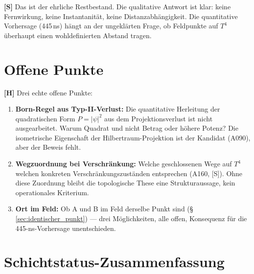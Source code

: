\textbf{[S]} Das ist der ehrliche Restbestand. Die qualitative Antwort
ist klar: keine Fernwirkung, keine Instantanität, keine Distanzabhängigkeit.
Die quantitative Vorhersage (445\,ns) hängt an der ungeklärten Frage,
ob Feldpunkte auf $T^4$ überhaupt einen wohldefinierten Abstand tragen.

\section{Offene Punkte}

\textbf{[H]} Drei echte offene Punkte:

\begin{enumerate}[leftmargin=1.6em,itemsep=0.3em]
  \item \textbf{Born-Regel aus Typ-II-Verlust:} Die quantitative
    Herleitung der quadratischen Form $P = |\psi|^2$ aus dem
    Projektionsverlust ist nicht ausgearbeitet. Warum Quadrat und
    nicht Betrag oder höhere Potenz? Die isometrische Eigenschaft
    der Hilbertraum-Projektion ist der Kandidat (A090), aber der
    Beweis fehlt.
  \item \textbf{Wegzuordnung bei Verschränkung:} Welche geschlossenen
    Wege auf $T^4$ welchen konkreten Verschränkungszuständen entsprechen
    (A160, [S]). Ohne diese Zuordnung bleibt die topologische These
    eine Strukturaussage, kein operationales Kriterium.
  \item \textbf{Ort im Feld:} Ob A und B im Feld derselbe Punkt
    sind (§\,\ref{sec:identischer_punkt}) --- drei Möglichkeiten,
    alle offen, Konsequenz für die 445-ns-Vorhersage unentschieden.
\end{enumerate}

\section{Schichtstatus-Zusammenfassung}

